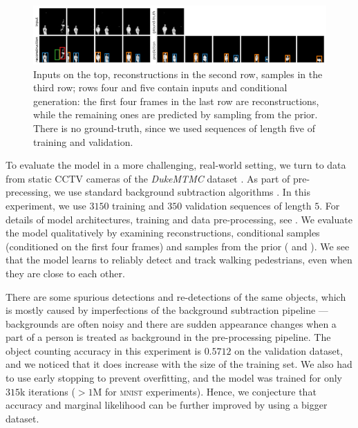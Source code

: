 \begin{figure}
\begin{minipage}[c]{0.49\linewidth}
    \end{minipage}
    \includegraphics[width=.95\linewidth]{figures/SQAIR/duke_cond_gen/front/sqair_duke_cond_after_four}
    \caption{Inputs on the top, reconstructions in the second row, samples in the third row; rows four and five contain inputs and conditional generation: the first four frames in the last row are reconstructions, while the remaining ones are predicted by sampling from the prior. There is no ground-truth, since we used sequences of length five of training and validation.}
    \label{fig:duke_rec}
\end{figure}
To evaluate the model in a more challenging, real-world setting, we turn to data from static CCTV cameras of the \textit{DukeMTMC} dataset \citep{ristani2016performance}. As part of pre-precessing, we use standard background subtraction algorithms \citep{itseez2015opencv}. In this experiment, we use $3150$ training and $350$ validation sequences of length $5$. For details of model architectures, training and data pre-processing, see .
We evaluate the model qualitatively by examining reconstructions, conditional samples (conditioned on the first four frames) and samples from the prior ( and ).
We see that the model learns to reliably detect and track walking pedestrians, even when they are close to each other.

There are some spurious detections and re-detections of the same objects, which is mostly caused by imperfections of the background subtraction pipeline --- backgrounds are often noisy and there are sudden appearance changes when a part of a person is treated as background in the pre-processing pipeline.
The object counting accuracy in this experiment is $0.5712$ on the validation dataset, and we noticed that it does increase with the size of the training set. We also had to use early stopping to prevent overfitting, and the model was trained for only $315$k iterations ($>1$M for \textsc{mnist} experiments). Hence, we conjecture that accuracy and marginal likelihood can be further improved by using a bigger dataset.